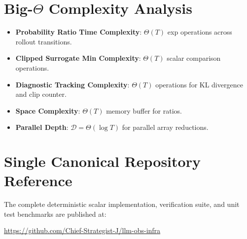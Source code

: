 \documentclass[11pt,a4paper]{article}
\theoremstyle{definition}
\begin{document}
\section{Big-$\Theta$ Complexity Analysis}

\begin{itemize}
    \item \textbf{Probability Ratio Time Complexity}: $\Theta(T)$ exp operations across rollout transitions.
    \item \textbf{Clipped Surrogate Min Complexity}: $\Theta(T)$ scalar comparison operations.
    \item \textbf{Diagnostic Tracking Complexity}: $\Theta(T)$ operations for KL divergence and clip counter.
    \item \textbf{Space Complexity}: $\Theta(T)$ memory buffer for ratios.
    \item \textbf{Parallel Depth}: $\mathcal{D} = \Theta(\log T)$ for parallel array reductions.
\end{itemize}

\section{Single Canonical Repository Reference}

The complete deterministic scalar implementation, verification suite, and unit test benchmarks are published at:
\begin{center}
\url{https://github.com/Chief-Strategist-J/llm-obs-infra}
\end{center}
\end{document}
